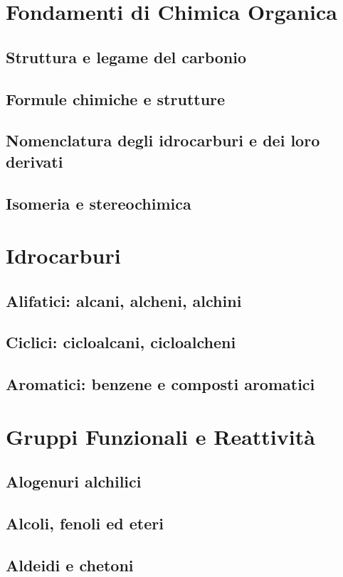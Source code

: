 \section{Fondamenti di Chimica Organica}
\subsection{Struttura e legame del carbonio}
\subsection{Formule chimiche e strutture}
\subsection{Nomenclatura degli idrocarburi e dei loro derivati}
\subsection{Isomeria e stereochimica}

\section{Idrocarburi}
\subsection{Alifatici: alcani, alcheni, alchini}
\subsection{Ciclici: cicloalcani, cicloalcheni}
\subsection{Aromatici: benzene e composti aromatici}

\section{Gruppi Funzionali e Reattività}
\subsection{Alogenuri alchilici}
\subsection{Alcoli, fenoli ed eteri}
\subsection{Aldeidi e chetoni}
